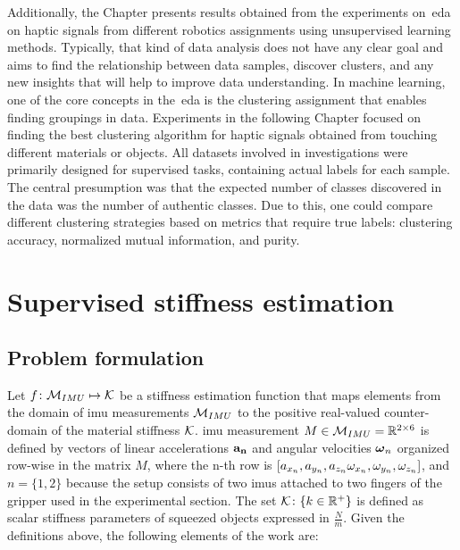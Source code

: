 \documentclass[a4paper, 10pt, twoside]{report}
\begin{document}
Additionally, the Chapter presents results obtained from the experiments on~\acrfull{eda} on haptic signals from different robotics assignments using unsupervised learning methods. Typically, that kind of data analysis does not have any clear goal and aims to find the relationship between data samples, discover clusters, and any new insights that will help to improve data understanding. In machine learning, one of the core concepts in the~\acrshort{eda} is the clustering assignment that enables finding groupings in data. Experiments in the following Chapter focused on finding the best clustering algorithm for haptic signals obtained from touching different materials or objects. All datasets involved in investigations were primarily designed for supervised tasks, containing actual labels for each sample. The central presumption was that the expected number of classes discovered in the data was the number of authentic classes. Due to this, one could compare different clustering strategies based on metrics that require true labels: clustering accuracy, normalized mutual information, and purity. 

\section{Supervised stiffness estimation}
\label{part:methods:materials:stiffness}

\subsection{Problem formulation}
\label{part:methods:materials:stiffness:problem}

Let $f\colon {\cal M}_{IMU} \mapsto {\cal K} $ be a stiffness estimation function that maps elements from the domain of \acrshort{imu} measurements ${\cal M}_{IMU}$ to the positive real-valued counter-domain of the material stiffness ${\cal K}$. \acrshort{imu} measurement $M \in {\cal M}_{IMU} = \mathbb{R}^{2\times6}$ is defined by vectors of linear accelerations $\mathbf{a_n}$ and angular velocities $\boldsymbol{\omega}_n$ organized row-wise in the matrix $M$, where the n-th row is $[a_{x_n}, a_{y_n}, a_{z_n} \omega_{x_n}, \omega_{y_n}, \omega_{z_n}]$, and $n=\{1, 2\}$ because the setup consists of two \acrshort{imu}s attached to two fingers of the gripper used in the experimental section. The set ${\cal K} \colon \{ k \in \mathbb{R}^{+} \}$ is defined as scalar stiffness parameters of squeezed objects expressed in $\frac{N}{m}$. Given the definitions above, the following elements of the work are:
\end{document}
